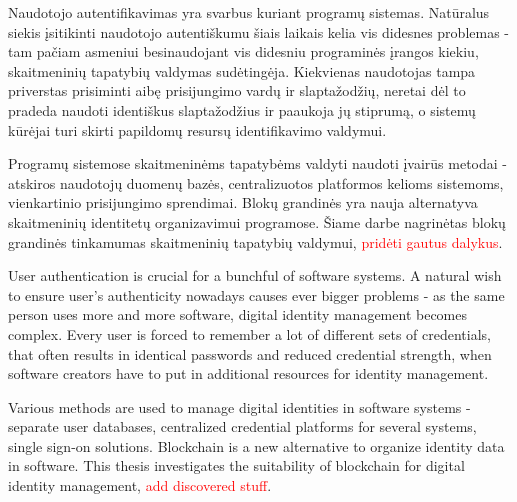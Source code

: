 Naudotojo autentifikavimas yra svarbus kuriant programų sistemas. Natūralus siekis
įsitikinti naudotojo autentiškumu šiais laikais kelia vis didesnes problemas - tam pačiam asmeniui besinaudojant
vis didesniu programinės įrangos kiekiu, skaitmeninių tapatybių valdymas sudėtingėja.
Kiekvienas naudotojas tampa priverstas prisiminti aibę prisijungimo
vardų ir slaptažodžių, neretai dėl to pradeda naudoti identiškus slaptažodžius ir paaukoja jų stiprumą, o sistemų kūrėjai turi
skirti papildomų resursų identifikavimo valdymui.


Programų sistemose skaitmeninėms tapatybėms valdyti naudoti įvairūs metodai - atskiros naudotojų duomenų bazės,
centralizuotos platformos kelioms sistemoms, vienkartinio prisijungimo sprendimai. Blokų grandinės yra nauja
alternatyva skaitmeninių identitetų organizavimui programose. Šiame darbe nagrinėtas blokų grandinės
tinkamumas skaitmeninių tapatybių valdymui, \textcolor{red}{pridėti gautus dalykus}.



User authentication is crucial for a bunchful of software systems. A natural wish to
ensure user's authenticity nowadays causes ever bigger problems - as the same person uses more and more software,
digital identity management becomes complex. Every user is forced to remember a lot of different sets of credentials,
that often results in identical passwords and reduced credential strength, when software creators have to put
in additional resources for identity management.

Various methods are used to manage digital identities in software systems - separate user databases,
centralized credential platforms for several systems, single sign-on solutions. Blockchain is a new
alternative to organize identity data in software. This thesis investigates the suitability of blockchain
for digital identity management, \textcolor{red}{add discovered stuff}.
